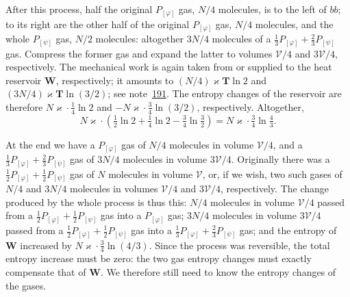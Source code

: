 \documentclass[fontsize=13pt,twoside,openany,headings=normal,parskip=false,bookmarkpackage=false,DIV=calc]{scrbook}
\begin{document}
After this process, half the original $P_{[\varphi]}$ gas, $N/4$ molecules, is to the left of $bb$; to its right are the
\hypertarget{origpage-199}{}%
other half of the original $P_{[\varphi]}$ gas, $N/4$ molecules, and the whole $P_{[\psi]}$ gas, $N/2$ molecules: altogether $3N/4$ molecules of a $\tfrac13P_{[\varphi]}+\tfrac23P_{[\psi]}$ gas. Compress the former gas and expand the latter to volumes $\mathcal V/4$ and $3\mathcal V/4$, respectively. The mechanical work is again taken from or supplied to the heat reservoir $\boldsymbol{W}$, respectively; it amounts to $(N/4)\varkappa\mathbf T\ln2$ and $(3N/4)\varkappa\mathbf T\ln(3/2)$; see note~\hyperlink{note-191}{191}. The entropy changes of the reservoir are therefore $N\varkappa\cdot\tfrac14\ln2$ and $-N\varkappa\cdot\tfrac34\ln(3/2)$, respectively. Altogether,
\[
N\varkappa\cdot\left(\tfrac12\ln2+\tfrac14\ln2-\tfrac34\ln\tfrac32\right)
=N\varkappa\cdot\tfrac34\ln\tfrac43.
\]

At the end we have a $P_{[\varphi]}$ gas of $N/4$ molecules in volume $\mathcal V/4$, and a $\tfrac13P_{[\varphi]}+\tfrac23P_{[\psi]}$ gas of $3N/4$ molecules in volume $3\mathcal V/4$. Originally there was a $\tfrac12P_{[\varphi]}+\tfrac12P_{[\psi]}$ gas of $N$ molecules in volume $\mathcal V$, or, if we wish, two such gases of $N/4$ and $3N/4$ molecules in volumes $\mathcal V/4$ and $3\mathcal V/4$, respectively. The change produced by the whole process is thus this: $N/4$ molecules in volume $\mathcal V/4$ passed from a $\tfrac12P_{[\varphi]}+\tfrac12P_{[\psi]}$ gas into a $P_{[\varphi]}$ gas; $3N/4$ molecules in volume $3\mathcal V/4$ passed from a $\tfrac12P_{[\varphi]}+\tfrac12P_{[\psi]}$ gas into a $\tfrac13P_{[\varphi]}+\tfrac23P_{[\psi]}$ gas; and the entropy of $\boldsymbol{W}$ increased by $N\varkappa\cdot\tfrac34\ln(4/3)$. Since the process was reversible, the total entropy increase must be zero: the two gas entropy changes must exactly compensate that of $\boldsymbol{W}$. We therefore still need to know the entropy changes of the gases.
\end{document}
